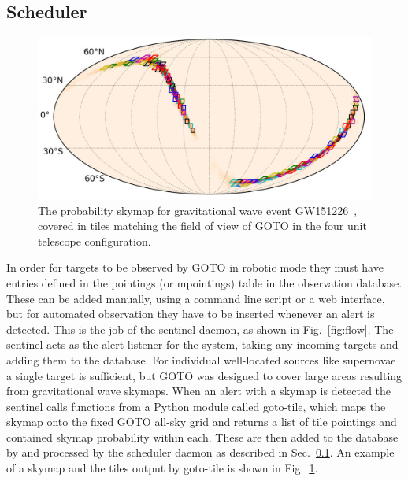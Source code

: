 \begin{colsection}
\begin{colsection}
\end{colsection}


\subsection{Scheduler}
\label{sec:scheduler}
\begin{colsection}

\begin{figure}[t]
\begin{center}
\includegraphics[width=14cm]{images/tiling.png}
\end{center}
\caption[The probability
 for GW151226]{The probability skymap for gravitational wave event GW151226~\citep{GW151226}, covered in tiles matching the field of view of GOTO in the four unit telescope configuration.}
\label{fig:tiling}
\end{figure}

In order for targets to be observed by GOTO in robotic mode they must have entries defined in the pointings (or mpointings) table in the observation database. These can be added manually, using a command line script or a web interface, but for automated observation they have to be inserted whenever an alert is detected. This is the job of the sentinel daemon, as shown in Fig.~\ref{fig:flow}. The sentinel acts as the alert listener for the system, taking any incoming targets and adding them to the database. For individual well-located sources like supernovae a single target is sufficient, but GOTO was designed to cover large areas resulting from gravitational wave skymaps. When an alert with a skymap is detected the sentinel calls functions from a Python module called \textsf{goto-tile}, which maps the skymap onto the fixed GOTO all-sky grid and returns a list of tile pointings and contained skymap probability within each. These are then added to the database by and processed by the scheduler daemon as described in Sec.~\ref{sec:scheduler}. An example of a skymap and the tiles output by \textsf{goto-tile} is shown in Fig.~\ref{fig:tiling}.


\end{colsection}
\end{colsection}
